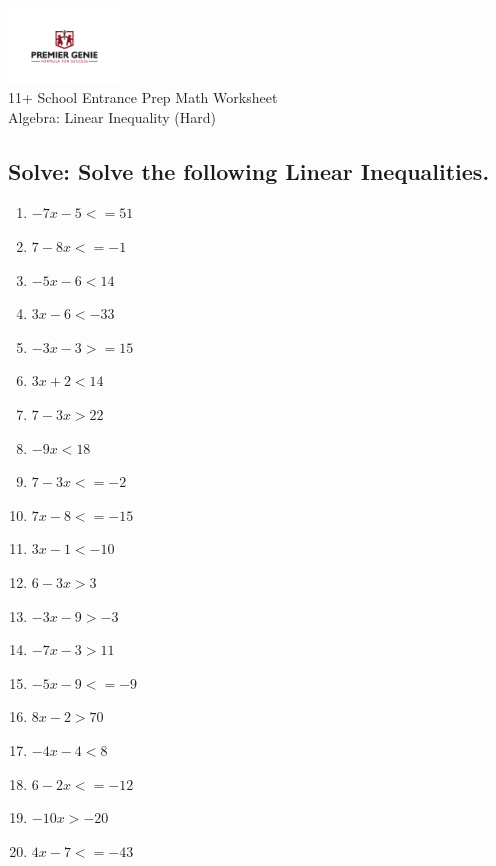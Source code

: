 \documentclass{article}
\begin{document}
\begin{center}
\includegraphics[width=3cm]{PREMGENIEJPG.jpg}\\
{\Large 11+ School Entrance Prep Math Worksheet}\\
{\Medium Algebra: Linear Inequality (Hard)}\\

\end{center}

\subsection*{Solve: Solve the following Linear Inequalities.}

\begin{enumerate}
\item $\displaystyle - 7 x - 5<=51 $ \ 
\item $\displaystyle 7 - 8 x<=-1 $ \ 
\item $\displaystyle - 5 x - 6<14 $ \ 
\item $\displaystyle 3 x - 6<-33 $ \ 
\item $\displaystyle - 3 x - 3>=15 $ \ 
\item $\displaystyle 3 x + 2<14 $ \ 
\item $\displaystyle 7 - 3 x>22 $ \ 
\item $\displaystyle - 9 x<18 $ \ 
\item $\displaystyle 7 - 3 x<=-2 $ \ 
\item $\displaystyle 7 x - 8<=-15 $ \ 
\item $\displaystyle 3 x - 1<-10 $ \ 
\item $\displaystyle 6 - 3 x>3 $ \ 
\item $\displaystyle - 3 x - 9>-3 $ \ 
\item $\displaystyle - 7 x - 3>11 $ \ 
\item $\displaystyle - 5 x - 9<=-9 $ \ 
\item $\displaystyle 8 x - 2>70 $ \ 
\item $\displaystyle - 4 x - 4<8 $ \ 
\item $\displaystyle 6 - 2 x<=-12 $ \ 
\item $\displaystyle - 10 x>-20 $ \ 
\item $\displaystyle 4 x - 7<=-43 $ \ 


\end{enumerate}
\end{document}
